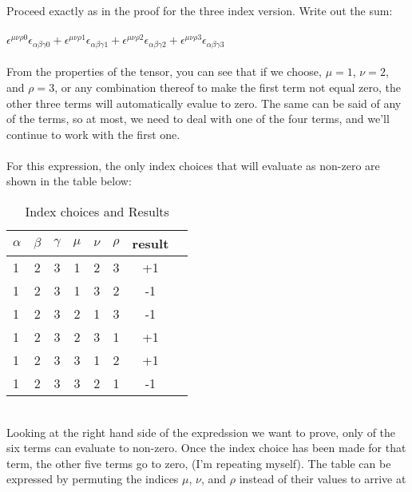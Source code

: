 \documentclass[prb,preprint]
{revtex4-1}
\begin{document}
Proceed exactly as in the proof for the three index version.  Write out the sum:
\\
\\
$\epsilon^{\mu\nu\rho 0}\epsilon_{\alpha\beta\gamma 0} + \epsilon^{\mu\nu\rho 1}\epsilon_{\alpha\beta\gamma 1} + \epsilon^{\mu\nu\rho 2}\epsilon_{\alpha\beta\gamma 2} + \epsilon^{\mu\nu\rho 3}\epsilon_{\alpha\beta\gamma 3}$
\\
\\
From the properties of the tensor, you can see that if we choose, $\mu = 1$, $\nu = 2$, and $\rho = 3$, or any combination thereof to make the first term not equal zero, the other three terms will automatically evalue to zero. The same can be said of any of the terms, so at most, we need to deal with one of the four terms, and we'll continue to work with the first one.
\\
\\
For this expression, the only index choices that will evaluate as non-zero are shown in the table below:
\begin{table}[h!]
\centering
\caption{Index choices and Results}
\begin{ruledtabular}
\begin{tabular}{l c c c c c c p{5cm}}
$\alpha$ & $\beta$ & $\gamma$ & $\mu$ & $\nu$ & $\rho$ & result \\
\hline	%
1 & 2 & 3 & 1 & 2 & 3 & +1 \\
1 & 2 & 3 & 1 & 3 & 2 & -1 \\
1 & 2 & 3 & 2 & 1 & 3 & -1 \\
1 & 2 & 3 & 2 & 3 & 1 & +1 \\
1 & 2 & 3 & 3 & 1 & 2 & +1 \\
1 & 2 & 3 & 3 & 2 & 1 & -1 \\
\end{tabular}
\end{ruledtabular}
\label{bosons}
\end{table}
\\
Looking at the right hand side of the expredssion we want to prove, only of the six terms can evaluate to non-zero.  Once the index choice has been made for that term, the other five terms go to zero, (I'm repeating myself).  The table can be expressed by permuting the indices $\mu$, $\nu$, and $\rho$ instead of their values to arrive at
\end{document}
